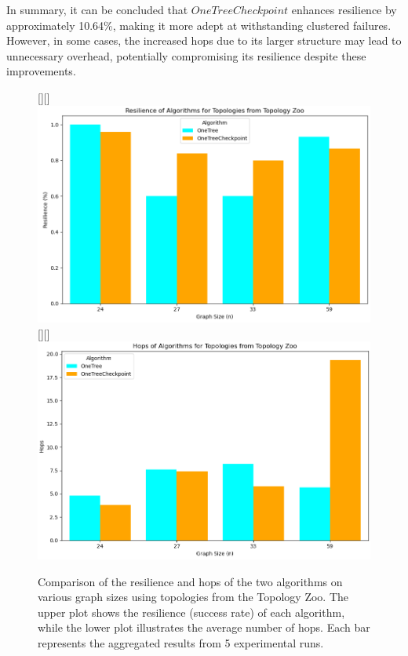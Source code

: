 \documentclass[conference]{IEEEtran}
\begin{document}
In summary, it can be concluded that $OneTreeCheckpoint$ enhances resilience by approximately 10.64\%, making it more adept at withstanding clustered failures. However, in some cases, the increased hops due to its larger structure may lead to unnecessary overhead, potentially compromising its resilience despite these improvements.

\begin{figure}[t]
    \centering
    \raisebox{0pt}[\height][\depth]{\hspace*{-1em}\includegraphics[scale=0.3]{figures/realTopoAfterChange_left.png}}\\
    \raisebox{0pt}[\height][\depth]{\hspace*{-1em}\includegraphics[scale=0.3]{figures/realTopoAfterChange_right.png}}
    \caption{Comparison of the resilience and hops of the two algorithms on various graph sizes using topologies from the Topology Zoo. The upper plot shows the resilience (success rate) of each algorithm, while the lower plot illustrates the average number of hops. Each bar represents the aggregated results from 5 experimental runs.}
    \label{realtopofig}
\end{figure}
\end{document}
